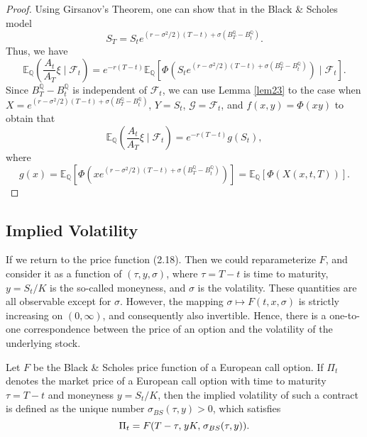\begin{proof}
    Using Girsanov's Theorem, one can show that in the Black \& Scholes model
    \begin{equation}
        S_{T}=S_{t}e^{(r-\sigma^{2}/2)(T-t)+\sigma(B_{T}^{\mathbb{Q}}-B_{t}^{\mathbb{Q}})}.
    \end{equation}
    Thus, we have
    \begin{equation}
        \mathbb{E}_{\mathbb{Q}}\left(\frac{A_{t}}{A_{T}}\xi \mid \mathcal{F}_{t}\right)=e^{-r(T-t)}\mathbb{E}_{\mathbb{Q}}\left[\Phi\left(S_{t}e^{(r-\sigma^{2}/2)(T-t)+\sigma(B_{T}^{\mathbb{Q}}-B_{t}^{\mathbb{Q}})}\right)\mid \mathcal{F}_{t}\right].
    \end{equation}
    Since $B_{T}^{\mathbb{Q}}-B_{t}^{\mathbb{Q}}$ is independent of $\mathcal{F}_t$, we can use Lemma \ref{lem23} to the case when $X=e^{(r-\sigma^{2}/2)(T-t)+\sigma(B_{T}^{\mathbb{Q}}-B_{t}^{\mathbb{Q}})}$, $Y=S_{t}$, $\mathcal{G}=\mathcal{F}_{t}$, and $f(x,y)=\Phi(xy)$ to obtain that
    \begin{equation}
        \mathbb{E}_{\mathbb{Q}}\left(\frac{A_{t}}{A_{T}}\xi \mid \mathcal{F}_{t}\right)=e^{-r(T-t)}g(S_{t}),
    \end{equation}
    where
    \begin{equation}
        g(x)=\mathbb{E}_{\mathbb{Q}}\left[\Phi\left(xe^{(r-\sigma^{2}/2)(T-t)+\sigma(B_{T}^{\mathbb{Q}}-B_{t}^{\mathbb{Q}})}\right)\right]=\mathbb{E}_{\mathbb{Q}}[\Phi(X(x,t,T))].
    \end{equation}
\end{proof}
\subsection{Implied Volatility}
If we return to the price function (2.18). Then we could reparameterize $F$, and consider it as a function of $(\tau, y, \sigma)$, where $\tau=T-t$ is time to maturity, $y=S_{t}/K$ is the so-called moneyness, and $\sigma$ is the volatility. These quantities are all observable except for $\sigma$. However, the mapping $\sigma\mapsto F(t,x,\sigma)$ is strictly increasing on $(0,\infty)$, and consequently also invertible. Hence, there is a one-to-one correspondence between the price of an option and the volatility of the underlying stock. 
\begin{defn}
    Let $F$ be the Black \& Scholes price function of a European call option. If $\Pi_{t}$ denotes the market price of a European call option with time to maturity $\tau=T-t$ and moneyness $y=S_{t}/K$, then the implied volatility of such a contract is defined as the unique number $\sigma_{BS}(\tau, y)>0$, which satisfies
    \begin{equation}
        \Pi_{t}=F\left(T-\tau, \hspace{1 pt}yK,\hspace{1 pt}\sigma_{BS}(\tau,y)\right).
    \end{equation}
\end{defn}
